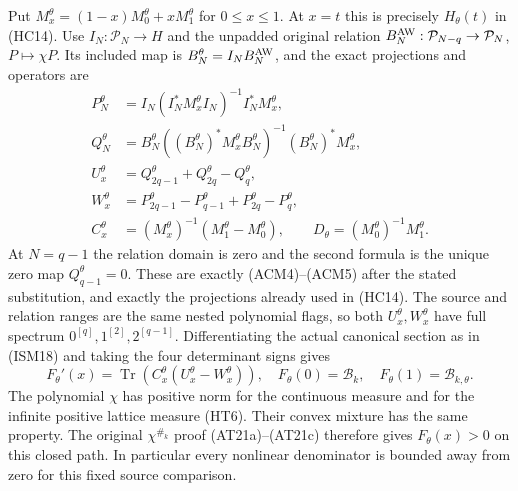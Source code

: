 Put $M_x^\theta=(1-x)M_0^\theta+xM_1^\theta$ for $0\le x\le1$.
At $x=t$ this is precisely $H_\theta(t)$ in (HC14).
Use $I_N:\mathcal P_N\to H$ and the unpadded original relation
$B_N^{\rm AW}:\mathcal P_{N-q}\to\mathcal P_N$, $P\mapsto\chi P$.
Its included map is $B_N^\theta=I_NB_N^{\rm AW}$, and the
exact projections and operators are
\[
\begin{aligned}
 P_N^\theta&=I_N(I_N^*M_x^\theta I_N)^{-1}I_N^*M_x^\theta,\\
 Q_N^\theta&=B_N^\theta((B_N^\theta)^*M_x^\theta B_N^\theta)^{-1}
                                  (B_N^\theta)^*M_x^\theta,\\
 U_x^\theta&=Q_{2q-1}^\theta+Q_{2q}^\theta-Q_q^\theta,\\
 W_x^\theta&=P_{2q-1}^\theta-P_{q-1}^\theta+P_{2q}^\theta-P_q^\theta,\\
 C_x^\theta&=(M_x^\theta)^{-1}(M_1^\theta-M_0^\theta),\qquad
 D_\theta=(M_0^\theta)^{-1}M_1^\theta .
\end{aligned}\tag{HC14c}
\]
At $N=q-1$ the relation domain is zero and the second formula
is the unique zero map $Q_{q-1}^\theta=0$.
These are exactly (ACM4)--(ACM5) after the stated substitution,
and exactly the projections already used in (HC14).
The source and relation ranges are the same nested polynomial
flags, so both $U_x^\theta,W_x^\theta$ have full spectrum
$0^{[q]},1^{[2]},2^{[q-1]}$. Differentiating the actual
canonical section as in (ISM18) and taking the four determinant
signs gives
\[
 F_\theta'(x)=\operatorname{Tr}(C_x^\theta(U_x^\theta-W_x^\theta)),
 \quad F_\theta(0)=\mathcal B_k,\quad
 F_\theta(1)=\mathcal B_{k,\theta}.
\]
The polynomial $\chi$ has positive norm for the continuous
measure and for the infinite positive lattice measure (HT6).
Their convex mixture has the same property. The original
$\chi^{\#_k}$ proof (AT21a)--(AT21c) therefore gives
$F_\theta(x)>0$ on this closed path. In particular every
nonlinear denominator is bounded away from zero for this fixed
source comparison.

